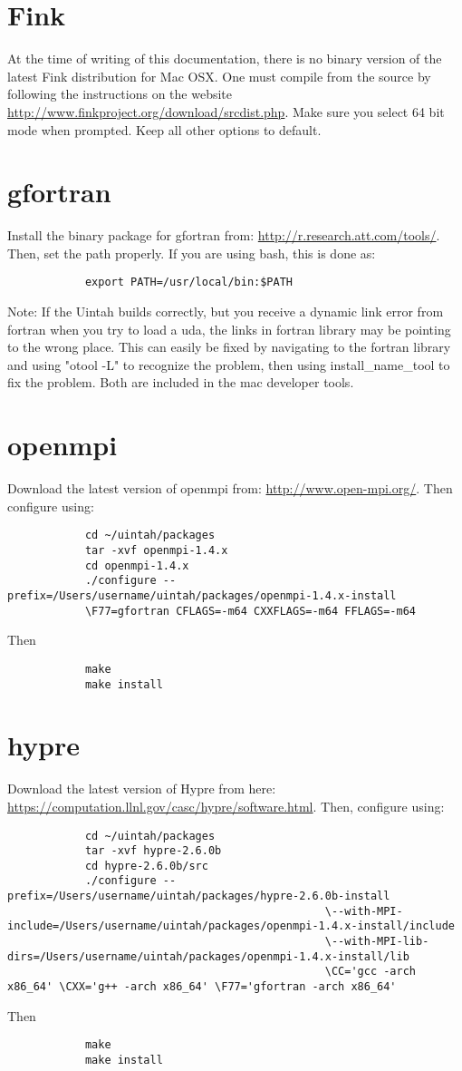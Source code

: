 \documentclass[11pt,fleqn]{book} %
\begin{document}
	\section{Fink}
		At the time of writing of this documentation, there is no binary version of the latest Fink distribution for Mac OSX. One must compile from the source by following the instructions on the website \url{http://www.finkproject.org/download/srcdist.php}. Make sure you select 64 bit mode when prompted. Keep all other options to default.
	
	\section{gfortran}
		Install the binary package for gfortran from: \url{http://r.research.att.com/tools/}. Then, set the path properly. If you are using bash, this is done as:
		\begin{lstlisting}
			export PATH=/usr/local/bin:$PATH
		\end{lstlisting}
		Note: If the Uintah builds correctly, but you receive a dynamic link error from fortran when you try to load a uda, the links in fortran library may be pointing to the wrong place.  This can easily be fixed by navigating to the fortran library and using "otool -L" to recognize the problem, then using install\_name\_tool to fix the problem.  Both are included in the mac developer tools.
	
	\section{openmpi}
		Download the latest version of openmpi from: \url{http://www.open-mpi.org/}. Then configure using:
		\begin{lstlisting}
			cd ~/uintah/packages
			tar -xvf openmpi-1.4.x
			cd openmpi-1.4.x
			./configure --prefix=/Users/username/uintah/packages/openmpi-1.4.x-install 
			\F77=gfortran CFLAGS=-m64 CXXFLAGS=-m64 FFLAGS=-m64
		\end{lstlisting}
		Then
		\begin{lstlisting}
			make
			make install
		\end{lstlisting}
		
		\section{hypre}
		Download the latest version of Hypre from here: \url{https://computation.llnl.gov/casc/hypre/software.html}. Then, configure using:
		\begin{lstlisting}
			cd ~/uintah/packages
			tar -xvf hypre-2.6.0b
			cd hypre-2.6.0b/src
			./configure --prefix=/Users/username/uintah/packages/hypre-2.6.0b-install 
												 \--with-MPI-include=/Users/username/uintah/packages/openmpi-1.4.x-install/include 
												 \--with-MPI-lib-dirs=/Users/username/uintah/packages/openmpi-1.4.x-install/lib 
												 \CC='gcc -arch x86_64' \CXX='g++ -arch x86_64' \F77='gfortran -arch x86_64' 
		\end{lstlisting}
		Then
		\begin{lstlisting}
			make
			make install
		\end{lstlisting}
		
\end{document}
